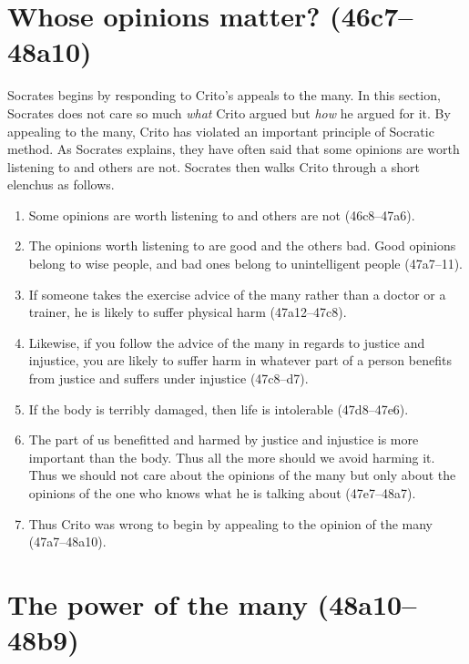 \documentclass[11pt]{article}
\begin{document}
\section{Whose opinions matter? (46c7--48a10)}

Socrates begins by responding to Crito's appeals to the many.  In this section, Socrates does not care so much \emph{what} Crito argued but \emph{how} he argued for it.  By appealing to the many, Crito has violated an important principle of Socratic method.  As Socrates explains, they have often said that some opinions are worth listening to and others are not.  Socrates then walks Crito through a short elenchus as follows.

\begin{enumerate}
    \item Some opinions are worth listening to and others are not (46c8--47a6).
    \item The opinions worth listening to are good and the others bad.  Good opinions belong to wise people, and bad ones belong to unintelligent people (47a7--11).
    \item If someone takes the exercise advice of the many rather than a doctor or a trainer, he is likely to suffer physical harm (47a12--47c8).
    \item Likewise, if you follow the advice of the many in regards to justice and injustice, you are likely to suffer harm in whatever part of a person benefits from justice and suffers under injustice (47c8--d7).
    \item If the body is terribly damaged, then life is intolerable (47d8--47e6).
    \item The part of us benefitted and harmed by justice and injustice is more important than the body.  Thus all the more should we avoid harming it.  Thus we should not care about the opinions of the many but only about the opinions of the one who knows what he is talking about (47e7--48a7).
    \item Thus Crito was wrong to begin by appealing to the opinion of the many (47a7--48a10).
\end{enumerate}

\section{The power of the many (48a10--48b9)}
\end{document}
